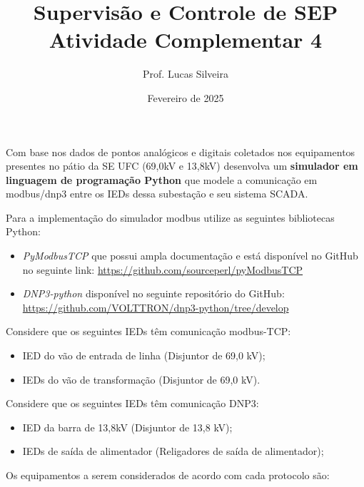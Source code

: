 \documentclass[12pt]{article}
\author{Prof. Lucas Silveira}
\date{Fevereiro de 2025}
\title{Supervisão e Controle de SEP\\Atividade Complementar 4}
\providecommand{\tightlist}{%
  \setlength{\itemsep}{0pt}\setlength{\parskip}{0pt}}
\begin{document}
\maketitle


Com base nos dados de pontos analógicos e digitais coletados nos equipamentos presentes no pátio da SE UFC (69,0kV e 13,8kV) desenvolva um \textbf{simulador em linguagem de programação Python} que modele a comunicação em modbus/dnp3 entre os IEDs dessa subestação e seu sistema SCADA.

Para a implementação do simulador modbus utilize as seguintes bibliotecas Python:

\begin{itemize}
  \tightlist
  \item \emph{PyModbusTCP} que possui ampla documentação e está disponível no GitHub no seguinte link: \url{https://github.com/sourceperl/pyModbusTCP}
  \item \emph{DNP3-python} disponível no seguinte repositório do GitHub: \url{https://github.com/VOLTTRON/dnp3-python/tree/develop}
\end{itemize}

Considere que os seguintes IEDs têm comunicação modbus-TCP: 

\begin{itemize}
  \tightlist
  \item IED do vão de entrada de linha (Disjuntor de 69,0 kV);
  \item IEDs do vão de transformação (Disjuntor de 69,0 kV).
\end{itemize}

Considere que os seguintes IEDs têm comunicação DNP3: 

\begin{itemize}
  \tightlist
  \item IED da barra de 13,8kV (Disjuntor de 13,8 kV);
  \item IEDs de saída de alimentador (Religadores de saída de alimentador);
\end{itemize}

Os equipamentos a serem considerados de acordo com cada protocolo são:
\end{document}
